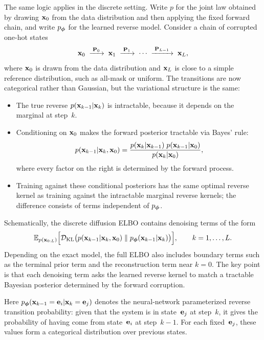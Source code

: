 The same logic applies in the discrete setting. Write $p$ for the joint law
obtained by drawing ${\mathbf{x}}_0$ from the data distribution and then applying the
fixed forward chain, and write $p_{{\bm{\phi}}}$ for the learned reverse model. Consider a chain of
corrupted one-hot states
\[
{\mathbf{x}}_0 \;\xrightarrow{\;{\mathbf{P}}_0\;}\; {\mathbf{x}}_1 \;\xrightarrow{\;{\mathbf{P}}_1\;}\;
\cdots \;\xrightarrow{\;{\mathbf{P}}_{L-1}\;}\; {\mathbf{x}}_L,
\]
where ${\mathbf{x}}_0$ is drawn from the data distribution and ${\mathbf{x}}_L$ is close to
a simple reference distribution, such as all-mask or uniform.  The transitions
are now categorical rather than Gaussian, but the variational structure is the
same:
\begin{itemize}[leftmargin=2em]
    \item The true reverse $p({\mathbf{x}}_{k-1}|{\mathbf{x}}_k)$ is intractable,
      because it depends on the marginal at step~$k$.
    \item Conditioning on ${\mathbf{x}}_0$ makes the forward posterior tractable
      via Bayes' rule:
      \[
      p({\mathbf{x}}_{k-1}|{\mathbf{x}}_k, {\mathbf{x}}_0)
      =
      \frac{p({\mathbf{x}}_k|{\mathbf{x}}_{k-1})\;p({\mathbf{x}}_{k-1}|{\mathbf{x}}_0)}
             {p({\mathbf{x}}_k|{\mathbf{x}}_0)},
      \]
      where every factor on the right is determined by the forward
      process.
    \item Training against these conditional posteriors has the same optimal
      reverse kernel as training against the intractable marginal reverse
      kernels; the difference consists of terms independent of $p_{{\bm{\phi}}}$.
\end{itemize}

Schematically, the discrete diffusion ELBO contains denoising terms of the form
\[
\mathbb{E}_{p({\mathbf{x}}_{0:L})}
 \Big[
\mathcal{D}_{\mathrm{KL}} \big(
  p({\mathbf{x}}_{k-1}|{\mathbf{x}}_k, {\mathbf{x}}_0)
  \;\|\;
  p_{{\bm{\phi}}}({\mathbf{x}}_{k-1}|{\mathbf{x}}_k)
\big)
\Big],
\qquad k=1,\ldots,L.
\]
Depending on the exact model, the full ELBO also includes boundary terms such
as the terminal prior term and the reconstruction term near $k=0$.  The key
point is that each denoising term asks the learned reverse kernel to match a
tractable Bayesian posterior determined by the forward corruption.

Here $p_{{\bm{\phi}}}({\mathbf{x}}_{k-1}={\mathbf{e}}_i|{\mathbf{x}}_k={\mathbf{e}}_j)$ denotes the neural-network
parameterized reverse transition probability: given that the system is in
state~${\mathbf{e}}_j$ at step~$k$, it gives the probability of having come from
state~${\mathbf{e}}_i$ at step~$k{-}1$.  For each fixed~${\mathbf{e}}_j$, these values form a
categorical distribution over previous states.

